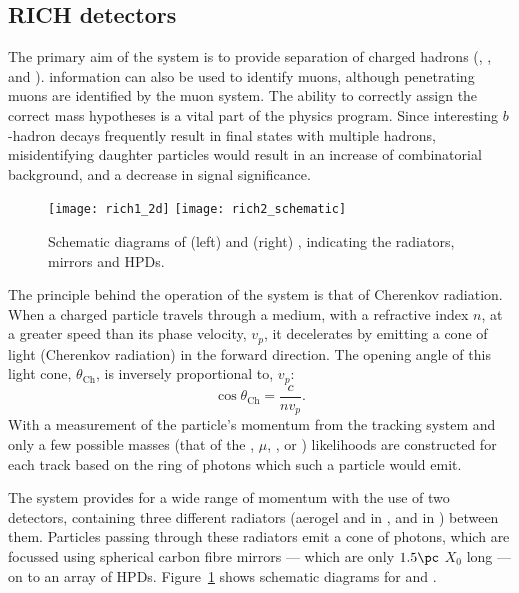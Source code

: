\subsection{RICH detectors}

The primary aim of the \lhcb \rich system is to provide \pid separation of charged hadrons (\pion,
\kaon, and \proton).
\rich information can also be used to identify muons, although penetrating muons are identified by
the muon system.
The ability to correctly assign the correct mass hypotheses is a vital part of the \lhcb physics
program.
Since interesting $b$-hadron decays frequently result in final states with multiple hadrons,
misidentifying daughter particles would result in an increase of combinatorial background, and
a decrease in signal significance.

\begin{figure}
  \begin{center}
    \texttt{[image: rich1\_2d]}
    \texttt{[image: rich2\_schematic]}
    \caption[Diagram of the LHCb RICH detectors]
    {
      Schematic diagrams of (left) \richone and (right) \richtwo, indicating the radiators,
      mirrors and HPDs.
    }
    \label{fig:lhcb:rich}
  \end{center}
\end{figure}

The principle behind the operation of the \rich system is that of Cherenkov radiation.
When a charged particle travels through a medium, with a refractive index $n$, at a greater speed
than its phase velocity, $v_p$, it decelerates by emitting a cone of light (Cherenkov radiation) in
the forward direction.
The opening angle of this light cone, $\theta_\mathrm{Ch}$, is inversely proportional to, $v_p$:
\begin{equation}
  \cos\theta_\mathrm{Ch}=\frac{c}{nv_p}.
\end{equation}
With a measurement of the particle's momentum from the tracking system and only a few possible
masses (that of the \electron, $\mu$, \pion, \kaon or \proton) likelihoods are constructed for each
track based on the ring of photons which such a particle would emit.

The \lhcb \rich system provides \pid for a wide range of momentum with the use of two \rich
detectors, containing three different radiators (aerogel and \cfourften in
\richone, and \cffour in \richtwo) between them.
Particles passing through these radiators emit a cone of photons, which are focussed using
spherical carbon fibre mirrors --- which are only $1.5\pc$ $X_0$ long --- on to an array of
\glspl{HPD}.
Figure~\ref{fig:lhcb:rich} shows schematic diagrams for \richone and \richtwo.

